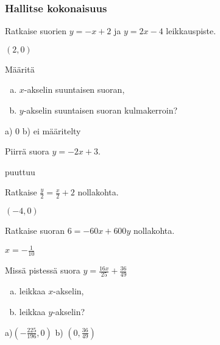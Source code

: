 \begin{tehtavasivu}
\subsubsection*{Hallitse kokonaisuus}

\begin{tehtava}
Ratkaise suorien $y=-x+2$ ja $y=2x-4$ leikkauspiste.
\begin{vastaus}
$(2, 0)$
\end{vastaus}
\end{tehtava}

\begin{tehtava}
Määritä
\begin{enumerate}[a)]
\item $x$-akselin suuntaisen suoran,
\item $y$-akselin suuntaisen suoran kulmakerroin?
\end{enumerate}
\begin{vastaus}
a) $0$ b) ei määritelty %
\end{vastaus}
\end{tehtava}

\begin{tehtava}
Piirrä suora $y=-2x+3$.
\begin{vastaus}
puuttuu
\end{vastaus}
\end{tehtava}

\begin{tehtava}
Ratkaise $\frac{y}{2}=\frac{x}{2}+2$ nollakohta.
\begin{vastaus}
$(-4, 0)$
\end{vastaus}
\end{tehtava}

\begin{tehtava}
Ratkaise suoran $6=-60x+600y$ nollakohta.
\begin{vastaus}
$x=-\frac{1}{10}$
\end{vastaus}
\end{tehtava}

\begin{tehtava}
Missä pistessä suora $y=\frac{16x}{25}+\frac{36}{49}$
\begin{enumerate}[a)]
\item leikkaa $x$-akselin,
\item leikkaa $y$-akselin?
\end{enumerate}
\begin{vastaus}
a)$(-\frac{225}{196}, 0)$ b) $(0, \frac{36}{49})$
\end{vastaus}
\end{tehtava}


\end{tehtavasivu}
